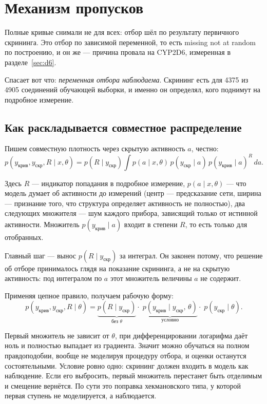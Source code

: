 \section{Механизм пропусков}
\label{sec:mnar}

Полные кривые снимали не для всех: отбор шёл по результату первичного скрининга. Это отбор по зависимой
переменной, то есть missing not at random по построению, и он же --- причина провала на CYP2D6,
измеренная в разделе~\ref{sec:d6}.

Спасает вот что: \emph{переменная отбора наблюдаема}. Скрининг есть для 4375 из 4905 соединений
обучающей выборки, и именно он определял, кого поднимут на подробное измерение.

\subsection{Как раскладывается совместное распределение}

Пишем совместную плотность через скрытую активность $a$, честно:
\begin{equation}
p(y_{\text{крив}}, y_{\text{скр}}, R \mid x,\theta)
= p(R \mid y_{\text{скр}}) \int p(a \mid x,\theta)\, p(y_{\text{скр}} \mid a)\, p(y_{\text{крив}} \mid a)^{R}\, da .
\label{eq:joint}
\end{equation}

Здесь $R$ --- индикатор попадания в подробное измерение, $p(a\mid x,\theta)$ --- что модель думает
об активности до измерений (центр --- предсказание сети, ширина --- признание того, что структура
определяет активность не полностью), два следующих множителя --- шум каждого прибора, зависящий только
от истинной активности. Множитель $p(y_{\text{крив}}\mid a)$ входит в степени $R$, то есть только для
отобранных.

Главный шаг --- вынос $p(R\mid y_{\text{скр}})$ за интеграл. Он законен потому, что решение об отборе
принималось глядя на показание скрининга, а не на скрытую активность: под интегралом по $a$ этот
множитель величины $a$ не содержит.

Применяя цепное правило, получаем рабочую форму:
\begin{equation}
p(y_{\text{крив}}, y_{\text{скр}}, R \mid \theta)
= \underbrace{p(R \mid y_{\text{скр}})}_{\text{без }\theta}
\cdot\; \underbrace{p(y_{\text{крив}} \mid y_{\text{скр}},\, \theta)}_{\text{условно}}
\cdot\; p(y_{\text{скр}} \mid \theta) .
\label{eq:factor}
\end{equation}

Первый множитель не зависит от $\theta$, при дифференцировании логарифма даёт ноль и полностью выпадает
из градиента. Значит можно обучаться на полном правдоподобии, вообще не моделируя процедуру отбора,
и оценки останутся состоятельными. Условие ровно одно: скрининг должен входить в модель как наблюдение.
Если его выбросить, первый множитель перестанет быть отделимым и смещение вернётся. По сути это поправка
хекмановского типа, у которой первая ступень не моделируется, а наблюдается.

